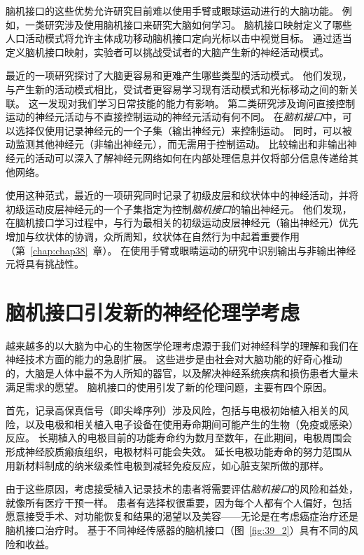 脑机接口的这些优势允许研究目前难以使用手臂或眼球运动进行的大脑功能。
例如，一类研究涉及使用脑机接口来研究大脑如何学习。 
脑机接口映射定义了哪些人口活动模式将允许主体成功移动脑机接口定向光标以击中视觉目标。
通过适当定义脑机接口映射，实验者可以挑战受试者的大脑产生新的神经活动模式。


最近的一项研究探讨了大脑更容易和更难产生哪些类型的活动模式。
他们发现，与产生新的活动模式相比，受试者更容易学习现有活动模式和光标移动之间的新关联。
这一发现对我们学习日常技能的能力有影响。
第二类研究涉及询问直接控制运动的神经元活动与不直接控制运动的神经元活动有何不同。
在\textit{脑机接口}中，可以选择仅使用记录神经元的一个子集（输出神经元）来控制运动。
同时，可以被动监测其他神经元（非输出神经元），而无需用于控制运动。
比较输出和非输出神经元的活动可以深入了解神经元网络如何在内部处理信息并仅将部分信息传递给其他网络。


使用这种范式，最近的一项研究同时记录了初级皮层和纹状体中的神经活动，并将初级运动皮层神经元的一个子集指定为控制\textit{脑机接口}的输出神经元。
他们发现，在脑机接口学习过程中，与行为最相关的初级运动皮层神经元（输出神经元）优先增加与纹状体的协调，众所周知，纹状体在自然行为中起着重要作用（第~\ref{chap:chap38}~章）。
在使用手臂或眼睛运动的研究中识别输出与非输出神经元将具有挑战性。



\section{脑机接口引发新的神经伦理学考虑}

越来越多的以大脑为中心的生物医学伦理考虑源于我们对神经科学的理解和我们在神经技术方面的能力的急剧扩展。
这些进步是由社会对大脑功能的好奇心推动的，大脑是人体中最不为人所知的器官，以及解决神经系统疾病和损伤患者大量未满足需求的愿望。
脑机接口的使用引发了新的伦理问题，主要有四个原因。


首先，记录高保真信号（即尖峰序列）涉及风险，包括与电极初始植入相关的风险，以及电极和相关植入电子设备在使用寿命期间可能产生的生物（免疫或感染）反应。
长期植入的电极目前的功能寿命约为数月至数年，在此期间，电极周围会形成神经胶质瘢痕组织，电极材料可能会失效。
延长电极功能寿命的努力范围从用新材料制成的纳米级柔性电极到减轻免疫反应，如心脏支架所做的那样。


由于这些原因，考虑接受植入记录技术的患者将需要评估\textit{脑机接口}的风险和益处，就像所有医疗干预一样。
患者有选择权很重要，因为每个人都有个人偏好，包括愿意接受手术、对功能恢复和结果的渴望以及美容——无论是在考虑癌症治疗还是脑机接口治疗时。
基于不同神经传感器的脑机接口（图~\ref{fig:39_2}）具有不同的风险和收益。



